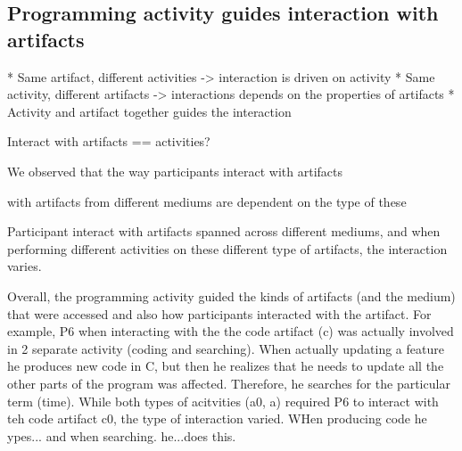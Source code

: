 
\subsection{Programming activity guides interaction with artifacts}


* Same artifact, different activities -> interaction is driven on activity
* Same activity, different artifacts -> interactions depends on the properties of artifacts
* Activity and artifact together guides the interaction

Interact with artifacts == activities?

We observed that the way participants interact with artifacts


with artifacts from different mediums are dependent on the type of these

Participant interact with artifacts spanned across different mediums, and when performing different activities on these different type of artifacts, the interaction varies.

Overall, the programming activity guided the kinds of artifacts (and the medium) that were accessed and also how participants interacted with the artifact. For example, P6 when interacting with the the code artifact (c) was actually involved in 2 separate activity (coding and searching). When actually updating a feature he produces new code in C, but then he realizes that he needs to update all the other parts of the program was affected. Therefore, he searches for the particular term (time). While both types of acitvities (a0, a) required P6 to interact with teh code artifact c0, the type of interaction varied. WHen producing code he ypes... and when searching. he...does this.


